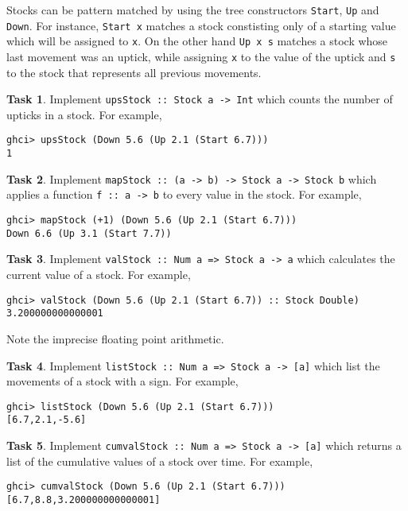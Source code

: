 \documentclass{article}[12pt]
\theoremstyle{definition}
\newtheorem{task}{Task}
\begin{document}
Stocks can be pattern matched by using the tree constructors \verb|Start|, \verb|Up| and \verb|Down|. For instance, \verb|Start x| matches a stock constisting only of a starting value which will be assigned to \verb|x|. On the other hand \verb|Up x s| matches a stock whose last movement was an uptick, while assigning \verb|x| to the value of the uptick and \verb|s| to the stock that represents all previous movements.

\begin{task}
    Implement \verb|upsStock :: Stock a -> Int| which counts the number of upticks in a stock. For example,
    \begin{verbatim}
ghci> upsStock (Down 5.6 (Up 2.1 (Start 6.7)))
1\end{verbatim}
\end{task}

\begin{task}
    Implement \verb|mapStock :: (a -> b) -> Stock a -> Stock b| which applies a function \verb|f :: a -> b| to every value in the stock. For example,
    \begin{verbatim}
ghci> mapStock (+1) (Down 5.6 (Up 2.1 (Start 6.7)))
Down 6.6 (Up 3.1 (Start 7.7))\end{verbatim}
\end{task}

\begin{task}
    Implement \verb|valStock :: Num a => Stock a -> a| which calculates the current value of a stock.  
    For example,
    \begin{verbatim}
ghci> valStock (Down 5.6 (Up 2.1 (Start 6.7)) :: Stock Double)
3.200000000000001\end{verbatim}
    Note the imprecise floating point arithmetic.
\end{task}

\begin{task}
    Implement \verb|listStock :: Num a => Stock a -> [a]| which list the movements of a stock with a sign.  
    For example,
    \begin{verbatim}
ghci> listStock (Down 5.6 (Up 2.1 (Start 6.7)))
[6.7,2.1,-5.6]\end{verbatim}
\end{task}

\begin{task}
    Implement \verb|cumvalStock :: Num a => Stock a -> [a]| which returns a list of the cumulative values of a stock over time.  
    For example,
    \begin{verbatim}
ghci> cumvalStock (Down 5.6 (Up 2.1 (Start 6.7)))
[6.7,8.8,3.200000000000001]\end{verbatim}
\end{task}
\end{document}
